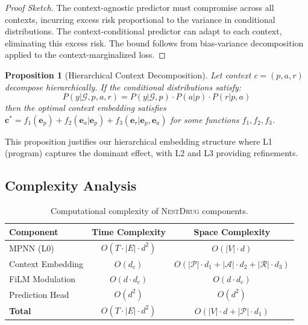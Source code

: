 \documentclass{article}
\newcommand{\methodname}{\textsc{NestDrug}}
\newtheorem{proposition}[theorem]{Proposition}
\begin{document}
\begin{proof}[Proof Sketch]
The context-agnostic predictor must compromise across all contexts, incurring excess risk proportional to the variance in conditional distributions. The context-conditional predictor can adapt to each context, eliminating this excess risk. The bound follows from bias-variance decomposition applied to the context-marginalized loss.
\end{proof}

\begin{proposition}[Hierarchical Context Decomposition]
\label{prop:hierarchy}
Let context $c = (p, a, r)$ decompose hierarchically. If the conditional distributions satisfy:
\begin{equation}
    P(y | \mathcal{G}, p, a, r) = P(y | \mathcal{G}, p) \cdot P(a | p) \cdot P(r | p, a)
\end{equation}
then the optimal context embedding satisfies $\mathbf{c}^* = f_1(\mathbf{e}_p) + f_2(\mathbf{e}_a | \mathbf{e}_p) + f_3(\mathbf{e}_r | \mathbf{e}_p, \mathbf{e}_a)$ for some functions $f_1, f_2, f_3$.
\end{proposition}

This proposition justifies our hierarchical embedding structure where L1 (program) captures the dominant effect, with L2 and L3 providing refinements.

\subsection{Complexity Analysis}

\begin{table}[h]
\caption{Computational complexity of \methodname{} components.}
\label{tab:complexity}
\centering
\small
\begin{tabular}{@{}lcc@{}}
\toprule
Component & Time Complexity & Space Complexity \\
\midrule
MPNN (L0) & $O(T \cdot |E| \cdot d^2)$ & $O(|V| \cdot d)$ \\
Context Embedding & $O(d_c)$ & $O(|\mathcal{P}| \cdot d_1 + |\mathcal{A}| \cdot d_2 + |\mathcal{R}| \cdot d_3)$ \\
FiLM Modulation & $O(d \cdot d_c)$ & $O(d \cdot d_c)$ \\
Prediction Head & $O(d^2)$ & $O(d^2)$ \\
\midrule
\textbf{Total} & $O(T \cdot |E| \cdot d^2)$ & $O(|V| \cdot d + |\mathcal{P}| \cdot d_1)$ \\
\bottomrule
\end{tabular}
\end{table}
\end{document}
